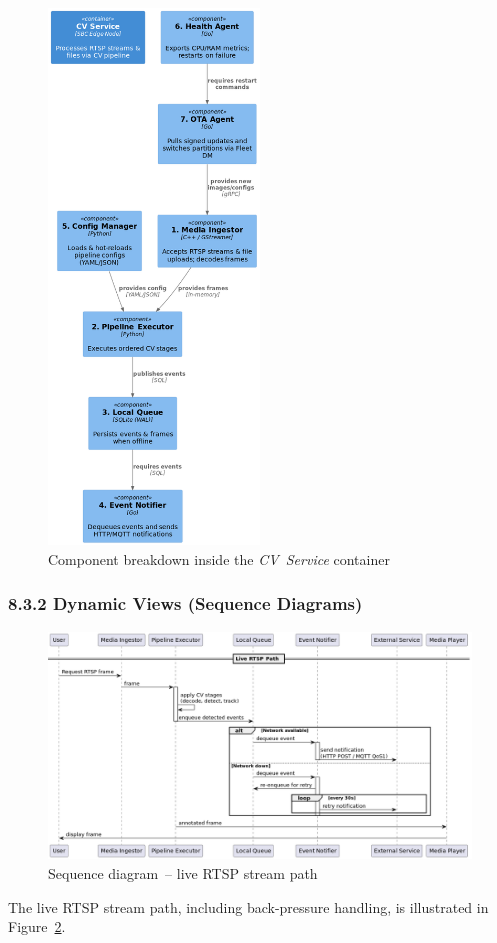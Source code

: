 \documentclass[11pt,a4paper]{article}
\begin{document}
\begin{figure}[H]
  \centering
  \includegraphics[width=0.5\textwidth]{fig/component_diagram.png}
  \caption{Component breakdown inside the \textit{CV Service} container}
  \label{fig:component}
\end{figure}

\subsubsection*{8.3.2 Dynamic Views (Sequence Diagrams)}

\begin{figure}[H]
  \centering
  \includegraphics[width=\textwidth]{fig/live_sequence.png}
  \caption{Sequence diagram – live RTSP stream path}
  \label{fig:seq_live}
\end{figure}
The live RTSP stream path, including back-pressure handling, is illustrated in Figure~\ref{fig:seq_live}.
\end{document}
